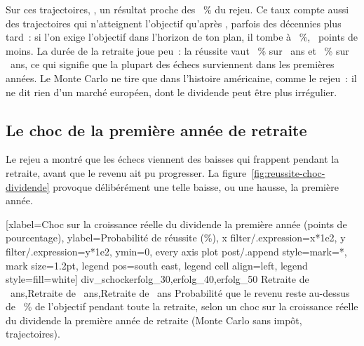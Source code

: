 Sur ces trajectoires, , un r\'esultat proche des
\RueckspielTenusProzent~\% du rejeu. Ce taux compte aussi des trajectoires qui n'atteignent l'objectif
qu'apr\`es \AnneeHorizonFin, parfois des d\'ecennies plus tard~: si l'on exige l'objectif dans
l'horizon de ton plan, il tombe \`a \McErfolgDansHorizon~\%, \McErfolgEcartHorizon~points de moins. La
dur\'ee de la retraite joue peu~: la r\'eussite vaut \McErfolgCourt~\% sur \McRenteAnsCourt~ans et
\McErfolgLong~\% sur \McRenteAnsLong~ans, ce qui signifie que la plupart des \'echecs surviennent dans
les \McRenteAnsCourt{} premi\`eres ann\'ees. Le Monte Carlo ne tire que dans l'histoire am\'ericaine,
comme le rejeu~: il ne dit rien d'un march\'e europ\'een, dont le dividende peut \^etre plus
irr\'egulier.

\subsection{Le choc de la premi\`ere ann\'ee de retraite}\label{sec:risques-sequence}

Le rejeu a montr\'e que les \'echecs viennent des baisses qui frappent pendant la retraite, avant que
le revenu ait pu progresser. La figure~\ref{fig:reussite-choc-dividende} provoque d\'elib\'er\'ement
une telle baisse, ou une hausse, la premi\`ere ann\'ee.


[xlabel={Choc sur la croissance r\'eelle du dividende la premi\`ere ann\'ee
  (points de pourcentage)}, ylabel={Probabilit\'e de r\'eussite (\%)},
  x filter/.expression={x*1e2}, y filter/.expression={y*1e2}, ymin=0,
  every axis plot post/.append style={mark=*, mark size=1.2pt},
  legend pos=south east, legend cell align=left, legend style={fill=white}]%
  {div_schock}{erfolg_30,erfolg_40,erfolg_50}%
  {{Retraite de \McRenteAnsCourt~ans},{Retraite de \McRenteAns~ans},{Retraite de \McRenteAnsLong~ans}}%
  {Probabilit\'e que le revenu reste au-dessus de \SeuilReussite~\% de l'objectif pendant toute la
  retraite, selon un choc sur la croissance r\'eelle du dividende la premi\`ere ann\'ee de retraite
  (Monte Carlo sans imp\^ot, \McTrajectoires{} trajectoires).\label{fig:reussite-choc-dividende}}

